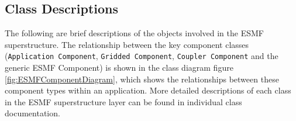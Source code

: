 
\subsection{Class Descriptions}

The following are brief descriptions of the objects involved in the
ESMF superstructure. The relationship between the key component classes
({\tt Application Component}, {\tt Gridded Component}, {\tt Coupler Component} and the generic ESMF Component)
is shown in the 
class diagram figure \ref{fig:ESMFComponentDiagram}, which shows the relationships between these component 
types within an application. More detailed descriptions of each class 
in the ESMF superstructure layer can be found in individual class documentation.

